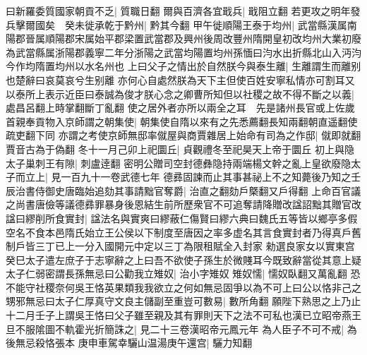 曰新羅委質國家朝貢不乏|{
	質職日翻}
爾與百濟各宜戢兵|{
	戢阻立翻}
若更攻之明年發兵擊爾國矣　癸未徙承乾于黔州|{
	黔其今翻}
甲午徙順陽王泰于均州|{
	武當縣漢属南陽郡晉属順陽郡宋属始平郡梁置武當郡及興州後周改豐州隋開皇初改均州大業初廢為武當縣属浙陽郡義寧二年分浙陽之武當均陽置均州孫愐曰汮水出折縣北山入沔汮今作均隋置均州以水名州也}
上曰父子之情出於自然朕今與泰生離|{
	生離謂生而離别也楚辭曰哀莫哀兮生别離}
亦何心自處然朕為天下主但使百姓安寧私情亦可割耳又以泰所上表示近臣曰泰誠為俊才朕心念之卿曹所知但以社稷之故不得不斷之以義|{
	處昌呂翻上時掌翻斷丁亂翻}
使之居外者亦所以兩全之耳　先是諸州長官或上佐歲首親奉貢物入京師謂之朝集使|{
	朝集使自隋以來有之先悉薦翻長知兩翻朝直遥翻使疏吏翻下同}
亦謂之考使京師無邸率僦屋與商賈雜居上始命有司為之作邸|{
	僦即就翻賈音古為于偽翻}
冬十一月己卯上祀圜丘|{
	貞觀禮冬至祀昊天上帝于圜丘}
初上與隐太子巢刺王有隙|{
	刺盧逹翻}
密明公贈司空封德彝隐持兩端楊文幹之亂上皇欲廢隐太子而立上|{
	見一百九十一卷武德七年}
德彞固諫而止其事甚祕上不之知薨後乃知之壬辰治書侍御史唐臨始追劾其事請黜官奪爵|{
	治直之翻劾戶槩翻又戶得翻}
上命百官議之尚書唐儉等議德彞罪暴身後恩結生前所歷衆官不可追奪請降贈改諡詔黜其贈官改諡曰繆削所食實封|{
	諡法名與實爽曰繆蔽仁傷賢曰繆六典曰魏氏五等皆以鄉亭多假空名不食本邑隋氏始立王公侯以下制度至唐因之率多虚名其言食實封者乃得真戶舊制戶皆三丁已上一分入國開元中定以三丁為限租賦全入封家}
勑選良家女以實東宫癸巳太子遣左庶子于志寧辭之上曰吾不欲使子孫生於微賤耳今既致辭當從其意上疑太子仁弱密謂長孫無忌曰公勸我立雉奴|{
	治小字雉奴}
雉奴懦|{
	懦奴臥翻又萬亂翻}
恐不能守社稷奈何吳王恪英果類我我欲立之何如無忌固爭以為不可上曰公以恪非己之甥邪無忌曰太子仁厚真守文良主儲副至重豈可數易|{
	數所角翻}
願陛下熟思之上乃止十二月壬子上謂吳王恪曰父子雖至親及其有罪則天下之法不可私也漢已立昭帝燕王旦不服隂圖不軌霍光折簡誅之|{
	見二十三卷漢昭帝元鳳元年}
為人臣子不可不戒|{
	為後無忌殺恪張本}
庚申車駕幸驪山温湯庚午還宫|{
	驪力知翻}



